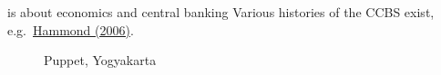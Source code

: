 \documentclass[
  letterpaper,
]{book}
\begin{document}
is about economics and central banking Various histories of the CCBS
exist,
e.g.~\href{https://www.bankofengland.co.uk/-/media/boe/files/quarterly-bulletin/2006/the-centre-for-central-banking-studies.pdf}{Hammond
(2006)}.

\begin{figure}

\begin{minipage}[t]{0.50\linewidth}

{\centering 


\caption{Puppet, Yogyakarta}

}

\end{minipage}%
%
\begin{minipage}[t]{0.50\linewidth}

{\centering 

}
\end{minipage}
\end{figure}
\end{document}

